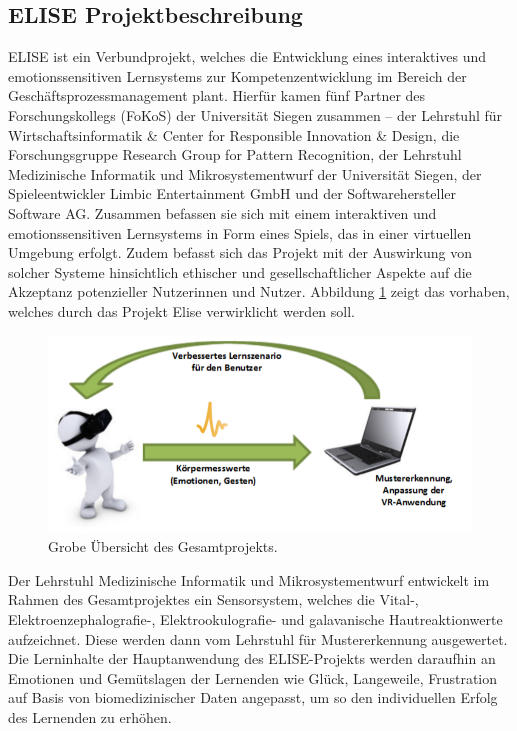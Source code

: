 \subsection{ELISE Projektbeschreibung} \label{elise-subsec}



ELISE ist ein Verbundprojekt, welches die Entwicklung eines interaktives und emotionssensitiven Lernsystems zur Kompetenzentwicklung im Bereich der Gesch{\"a}ftsprozessmanagement plant. 
Hierf{\"u}r kamen f{\"u}nf Partner des Forschungskollegs (FoKoS) der Universit{\"a}t Siegen zusammen – der Lehrstuhl f{\"u}r Wirtschaftsinformatik \& Center for Responsible Innovation \& Design, die Forschungsgruppe Research Group for Pattern Recognition, der Lehrstuhl Medizinische Informatik und Mikrosystementwurf der Universit{\"a}t Siegen, der Spieleentwickler Limbic Entertainment GmbH und der Softwarehersteller Software AG. 
Zusammen befassen sie sich mit einem interaktiven und emotionssensitiven Lernsystems in Form eines Spiels, das in einer virtuellen Umgebung erfolgt. 
Zudem befasst sich das Projekt mit der Auswirkung von solcher Systeme hinsichtlich ethischer und gesellschaftlicher Aspekte auf die Akzeptanz potenzieller Nutzerinnen und Nutzer.
Abbildung \ref{fig-elise} zeigt das vorhaben, welches durch das Projekt Elise verwirklicht werden soll.


\begin{figure}[H] \centering
\includegraphics[width=12cm]{Images/elise_projektbeschreibung.png} 
\vspace{-0.3cm} 
\caption{Grobe {\"U}bersicht des Gesamtprojekts\cite{msckroenert}.}
\label{fig-elise} 
\end{figure}

Der Lehrstuhl Medizinische Informatik und Mikrosystementwurf entwickelt im Rahmen des Gesamtprojektes ein Sensorsystem, welches die Vital-, Elektroenzephalografie-, Elektrookulografie- und galavanische Hautreaktionwerte aufzeichnet. 
Diese werden dann vom Lehrstuhl f{\"u}r Mustererkennung ausgewertet. 
Die Lerninhalte der Hauptanwendung des ELISE-Projekts werden daraufhin an Emotionen und Gem{\"u}tslagen der Lernenden wie Gl{\"u}ck, Langeweile, Frustration auf Basis von biomedizinischer Daten angepasst, um so den individuellen Erfolg des Lernenden zu erh{\"o}hen.